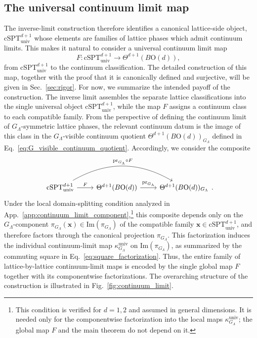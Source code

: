 \documentclass[aps,prx,reprint,superscriptaddress,twocolumn,amsmath,amssymb,amsfonts, nofootinbib]{revtex4-2}
\newcommand{\csptu}{\mathrm{cSPT}^{d+1}_{\mathrm{univ}}}
\theoremstyle{apsstyle}
\begin{document}
\subsection{The universal continuum limit map}
\label{sec:univ_cont_limit}
The inverse-limit construction therefore identifies a canonical lattice-side object, $\csptu$ whose elements are families of lattice phases which admit continuum limits. This makes it natural to consider a universal continuum limit map
\begin{equation*}
F:\csptu\to \Theta^{d+1}(B\mathrm{O}(d)),
\end{equation*}
from $\csptu$ to the continuum classification. The detailed construction of this map, together with the proof that it is canonically defined and surjective, will be given in Sec.~\ref{sec:rigor}. For now, we summarize the intended payoff of the construction. The inverse limit assembles the separate lattice classifications into the single universal object $\csptu$, while the map $F$ assigns a continuum class to each compatible family. From the perspective of defining the continuum limit of $G_{\Lambda}$-symmetric lattice phases, the relevant continuum datum is the image of this class in the $G_{\Lambda}$-visible continuum quotient $\Theta^{d+1}(B\mathrm{O}(d))_{G_{\Lambda}}$ defined in Eq.~\eqref{eq:G_visible_continuum_quotient}. Accordingly, we consider the composite
\begin{equation*}
\begin{tikzcd}
\csptu \arrow[r, "F"] \arrow[rr, bend left=30, "\mathrm{pr}_{G_{\Lambda}}\circ F"]& \Theta^{d+1}(B\mathrm{O}(d)) \arrow[r, "\mathrm{pr}_{G_{\Lambda}}"] &\Theta^{d+1}(B\mathrm{O}(d))_{G_{\Lambda}}
\end{tikzcd}.
\end{equation*}
Under the local domain-splitting condition analyzed in App.~\ref{app:continuum_limit_component},\footnote{This condition is verified for $d=1,2$ and assumed in general dimensions. It is needed only for the componentwise factorization into the local maps $\kappa^{\mathrm{univ}}_{G_{\Lambda}}$; the global map $F$ and the main theorem do not depend on it.} this composite depends only on the $G_{\Lambda}$-component $\pi_{G_{\Lambda}}(\mathbf{x})\in\mathrm{Im}(\pi_{G_{\Lambda}})$ of the compatible family $\mathbf{x}\in\csptu$, and therefore factors through the canonical projection $\pi_{G_{\Lambda}}$. This factorization induces the individual continuum-limit map $\kappa^{\mathrm{univ}}_{G_{\Lambda}}$ on $\mathrm{Im}(\pi_{G_{\Lambda}})$, as summarized by the commuting square in Eq.~\eqref{eq:square_factorization}. Thus, the entire family of lattice-by-lattice continuum-limit maps is encoded by the single global map $F$ together with its componentwise factorizations. The overarching structure of the construction is illustrated in Fig.~\ref{fig:continuum_limit}.
\end{document}
